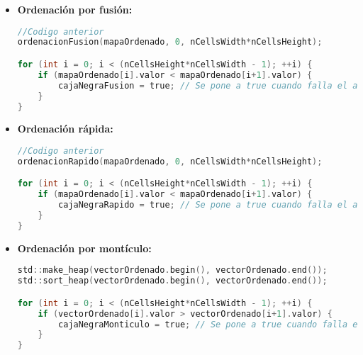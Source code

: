 \begin{itemize}
\item \textbf{Ordenación por fusión:}
\begin{lstlisting}[language=C]
//Codigo anterior
ordenacionFusion(mapaOrdenado, 0, nCellsWidth*nCellsHeight);

for (int i = 0; i < (nCellsHeight*nCellsWidth - 1); ++i) {
    if (mapaOrdenado[i].valor < mapaOrdenado[i+1].valor) {
        cajaNegraFusion = true; // Se pone a true cuando falla el algoritmo
    }
}
\end{lstlisting}
\item \textbf{Ordenación rápida:}
\begin{lstlisting}[language=C]
//Codigo anterior
ordenacionRapido(mapaOrdenado, 0, nCellsWidth*nCellsHeight);

for (int i = 0; i < (nCellsHeight*nCellsWidth - 1); ++i) {
    if (mapaOrdenado[i].valor < mapaOrdenado[i+1].valor) {
        cajaNegraRapido = true; // Se pone a true cuando falla el algoritmo
    }
}
\end{lstlisting}
\item \textbf{Ordenación por montículo:}
\begin{lstlisting}[language=C]
std::make_heap(vectorOrdenado.begin(), vectorOrdenado.end());
std::sort_heap(vectorOrdenado.begin(), vectorOrdenado.end());

for (int i = 0; i < (nCellsHeight*nCellsWidth - 1); ++i) {
    if (vectorOrdenado[i].valor > vectorOrdenado[i+1].valor) {
        cajaNegraMonticulo = true; // Se pone a true cuando falla el algoritmo
    }
}
\end{lstlisting}
\end{itemize}
